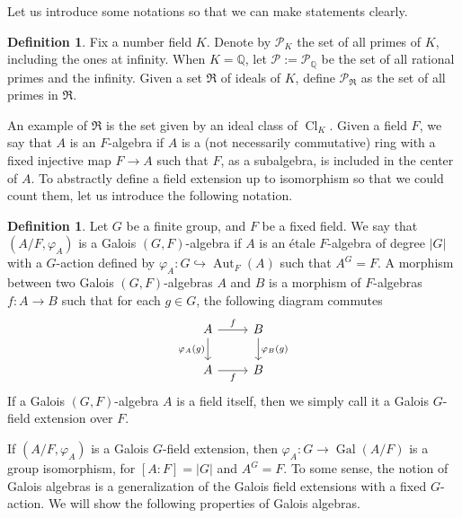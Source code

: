 \documentclass[12pt,a4paper]{amsart}
\numberwithin{equation}{section}%
\theoremstyle{plain}%
\theoremstyle{definition}%
\newtheorem{definition}[theorem]{Definition}%
\theoremstyle{remark}%
\begin{document}
	Let us introduce some notations so that we can make statements clearly.
	\begin{definition}\label{def:set of primes}
		Fix a number field $K$.
		Denote by $\mathcal{P}_K$ the set of all primes of $K$, including the ones at infinity.
		When $K=\mathbb{Q}$, let $\mathcal{P}:=\mathcal{P}_{\mathbb{Q}}$ be the set of all rational primes and the infinity.
		Given a set $\mathfrak{R}$ of ideals of $K$, define $\mathcal{P}_{\mathfrak{R}}$ as the set of all primes in $\mathfrak{R}$.
	\end{definition} 
	An example of $\mathfrak{R}$ is the set given by an ideal class of $\operatorname{Cl}_K$.
	Given a field $F$, we say that $A$ is an $F$-algebra if $A$ is a (not necessarily commutative) ring with a fixed injective map $F\to A$ such that $F$, as a subalgebra, is included in the center of $A$.	
	To abstractly define a field extension up to isomorphism so that we could count them, let us introduce the following notation.
	\begin{definition}\label{def: Galois algebras}		
		Let $G$ be a finite group, and $F$ be a fixed field.
		We say that $(A/F,\varphi_A)$ is a Galois $(G,F)$-algebra if $A$ is an {\'e}tale $F$-algebra of degree $\lvert G\rvert$ with a $G$-action defined by $\varphi_A:G\hookrightarrow\operatorname{Aut}_F(A)$ such that $A^G=F$.
		A morphism between two Galois $(G,F)$-algebras $A$ and $B$ is a morphism of $F$-algebras $f:A\to B$ such that for each $g\in G$, the following diagram commutes
		\begin{equation*}
			\begin{tikzcd}
				A\arrow[r,"f"]&B\arrow[d,"\varphi_B(g)"]\\
				A\arrow[u,leftarrow,"\varphi_A(g)"]&B\arrow[l,leftarrow,"f"]
			\end{tikzcd}
		\end{equation*}
		If a Galois $(G,F)$-algebra $A$ is a field itself, then we simply call it a Galois $G$-field extension over $F$.
	\end{definition}
	If $(A/F,\varphi_A)$ is a Galois $G$-field extension, then $\varphi_A:G\to\operatorname{Gal}(A/F)$ is a group isomorphism, for $[A:F]=\lvert G\rvert$ and $A^G=F$.
	To some sense, the notion of Galois algebras is a generalization of the Galois field extensions with a fixed $G$-action.
	We will show the following properties of Galois algebras.
\end{document}
